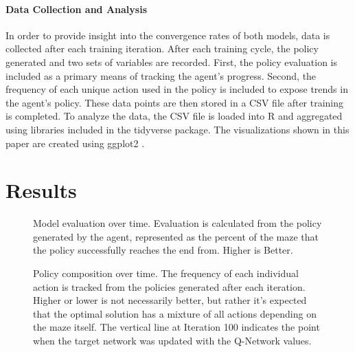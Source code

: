 \documentclass[12pt]{article}
\begin{document}
\paragraph{Data Collection and Analysis}

In order to provide insight into the convergence rates of both models, data is collected after each training iteration.
After each training cycle, the policy generated and two sets of variables are recorded.
First, the policy evaluation is included as a primary means of tracking the agent's progress.
Second, the frequency of each unique action used in the policy is included to expose trends in the agent's policy.
These data points are then stored in a CSV file after training is completed.
To analyze the data, the CSV file is loaded into R \cite{lang_r} and aggregated using libraries included in the tidyverse \cite{lib_tidyverse} package.
The visualizations shown in this paper are created using ggplot2 \cite{lib_ggplot2}.

\section{Results}

%
%
%

\begin{figure}[h]
	\begin{center}
	
	\end{center}
    \caption{Model evaluation over time. Evaluation is calculated from the policy generated by the agent, represented as the percent of the maze that the policy successfully reaches the end from. Higher is Better.}
		\label{fig:evaluation}
\end{figure}

\begin{figure}[h]
	\begin{center}
	
	\end{center}
	\caption{Policy composition over time. The frequency of each individual action is tracked from the policies generated after each iteration. Higher or lower is not necessarily better, but rather it's expected that the optimal solution has a mixture of all actions depending on the maze itself. The vertical line at Iteration 100 indicates the point when the target network was updated with the Q-Network values.}
	\label{fig:directional}
\end{figure}
\end{document}
